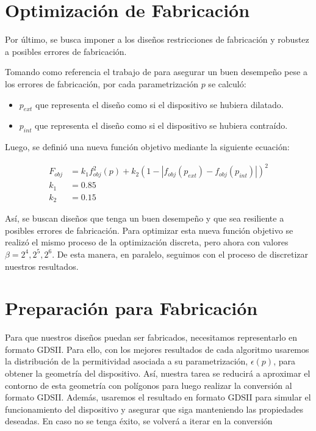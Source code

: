 \section{Optimización de Fabricación}

Por último, se busca imponer a los diseños restricciones de fabricación y robustez a posibles errores
de fabricación. 

Tomando como referencia el trabajo de \cite{Hammond20} para asegurar un buen desempeño pese a los errores de
fabricación, por cada parametrización $p$ se calculó:

\begin{itemize}
  \item $p_{ext}$ que representa el diseño como si el dispositivo se hubiera dilatado.
  \item $p_{int}$ que representa el diseño como si el dispositivo se hubiera contraído.
\end{itemize}

Luego, se definió una nueva función objetivo mediante la siguiente ecuación:

\begin{equation}
  \begin{split}
    F_{obj} &= k_1 f^2_{obj}(p) + k_2 (1 - |f_{obj}(p_{ext}) - f_{obj}(p_{int})|)^2\\
    k_1 &= 0.85\\
    k_2 &= 0.15
  \end{split}
  \label{eq:final-fom}
\end{equation}

Así, se buscan diseños que tenga un buen desempeño y que sea resiliente a posibles errores de fabricación.
Para optimizar esta nueva función objetivo se realizó el mismo proceso de la optimización discreta, pero ahora
con valores $\beta = 2^4, 2^5, 2^6$. De esta manera, en paralelo, seguimos con el proceso de discretizar
nuestros resultados.


\section{Preparación para Fabricación}


Para que nuestros diseños puedan ser fabricados, necesitamos representarlo en formato GDSII.
Para ello, con los mejores resultados de cada algoritmo usaremos la distribución de la permitividad asociada a su parametrización, $\epsilon(p)$,
para obtener la geometría del dispositivo.
Así, nuestra tarea se reducirá a aproximar el contorno de esta geometría con polígonos para luego realizar la conversión al formato GDSII.
Además, usaremos el resultado en formato GDSII para simular el funcionamiento del dispositivo y asegurar que siga manteniendo las propiedades deseadas.
En caso no se tenga éxito, se volverá a iterar en la conversión


